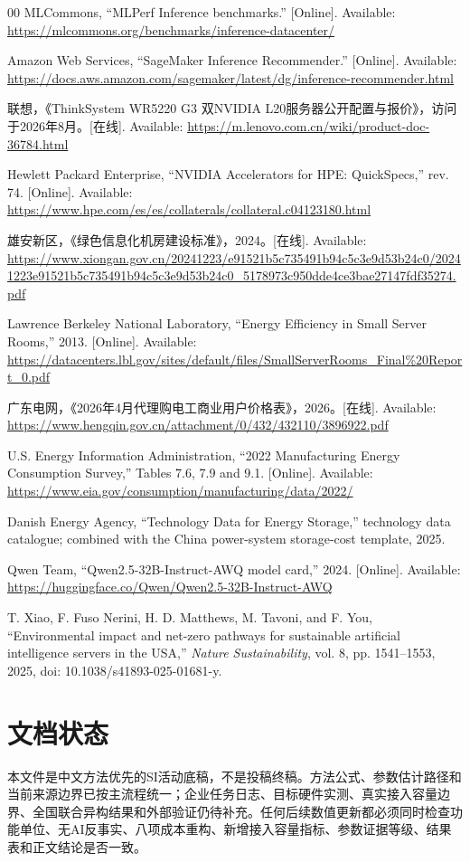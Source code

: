 \documentclass[preprint]{elsarticle}
\begin{document}
\begin{thebibliography}{00}
MLCommons, ``MLPerf Inference benchmarks.'' [Online]. Available: \url{https://mlcommons.org/benchmarks/inference-datacenter/}

Amazon Web Services, ``SageMaker Inference Recommender.'' [Online]. Available: \url{https://docs.aws.amazon.com/sagemaker/latest/dg/inference-recommender.html}

联想，《ThinkSystem WR5220 G3 双NVIDIA L20服务器公开配置与报价》，访问于2026年8月。[在线]. Available: \url{https://m.lenovo.com.cn/wiki/product-doc-36784.html}

Hewlett Packard Enterprise, ``NVIDIA Accelerators for HPE: QuickSpecs,'' rev. 74. [Online]. Available: \url{https://www.hpe.com/es/es/collaterals/collateral.c04123180.html}

雄安新区，《绿色信息化机房建设标准》，2024。[在线]. Available: \url{https://www.xiongan.gov.cn/20241223/e91521b5c735491b94c5c3e9d53b24c0/20241223e91521b5c735491b94c5c3e9d53b24c0_5178973c950dde4ce3bae27147fdf35274.pdf}

Lawrence Berkeley National Laboratory, ``Energy Efficiency in Small Server Rooms,'' 2013. [Online]. Available: \url{https://datacenters.lbl.gov/sites/default/files/SmallServerRooms_Final%20Report_0.pdf}

广东电网，《2026年4月代理购电工商业用户价格表》，2026。[在线]. Available: \url{https://www.hengqin.gov.cn/attachment/0/432/432110/3896922.pdf}

U.S. Energy Information Administration, ``2022 Manufacturing Energy Consumption Survey,'' Tables 7.6, 7.9 and 9.1. [Online]. Available: \url{https://www.eia.gov/consumption/manufacturing/data/2022/}

Danish Energy Agency, ``Technology Data for Energy Storage,'' technology data catalogue; combined with the China power-system storage-cost template, 2025.

Qwen Team, ``Qwen2.5-32B-Instruct-AWQ model card,'' 2024. [Online]. Available: \url{https://huggingface.co/Qwen/Qwen2.5-32B-Instruct-AWQ}

T. Xiao, F. Fuso Nerini, H. D. Matthews, M. Tavoni, and F. You, ``Environmental impact and net-zero pathways for sustainable artificial intelligence servers in the USA,'' \emph{Nature Sustainability}, vol. 8, pp. 1541--1553, 2025, doi: 10.1038/s41893-025-01681-y.

\end{thebibliography}

\section*{文档状态}

本文件是中文方法优先的SI活动底稿，不是投稿终稿。方法公式、参数估计路径和当前来源边界已按主流程统一；企业任务日志、目标硬件实测、真实接入容量边界、全国联合异构结果和外部验证仍待补充。任何后续数值更新都必须同时检查功能单位、无AI反事实、八项成本重构、新增接入容量指标、参数证据等级、结果表和正文结论是否一致。
\end{document}
